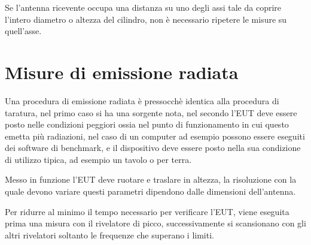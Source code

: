 Se l'antenna ricevente occupa una distanza su uno degli assi tale da coprire l'intero diametro o altezza
del cilindro, non è necessario ripetere le misure su quell'asse.

\newpage

\section{Misure di emissione radiata}
Una procedura di emissione radiata è pressocchè identica alla procedura di taratura,
nel primo caso si ha una sorgente nota, nel secondo l'EUT deve essere posto nelle condizioni peggiori
ossia nel punto di funzionamento in cui questo emetta più radiazioni, nel caso di un computer
ad esempio possono essere eseguiti dei software di benchmark, e il dispositivo deve essere posto nella sua
condizione di utilizzo tipica, ad esempio un tavolo o per terra.

Messo in funzione l'EUT deve ruotare e traslare in altezza, la risoluzione con la quale devono variare
questi parametri dipendono dalle dimensioni dell'antenna. %

Per ridurre al minimo il tempo necessario per verificare l'EUT, viene eseguita prima 
una misura con il rivelatore di picco, successivamente si scansionano con gli altri
rivelatori soltanto le frequenze che superano i limiti.

